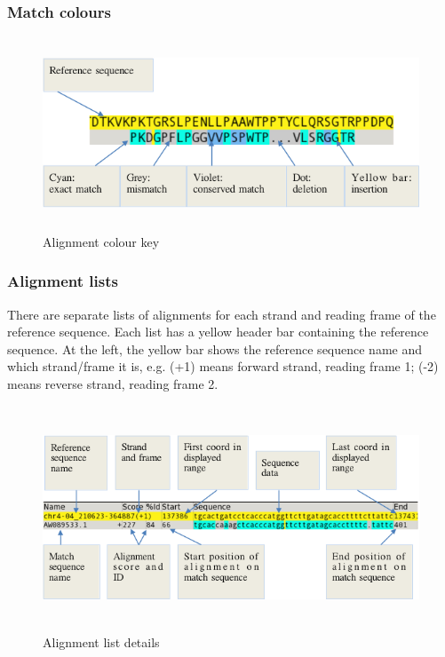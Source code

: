 \documentclass[letterpaper]{article}
\begin{document}
\bigskip

{\color[rgb]{0.30980393,0.5058824,0.7411765}\subsubsection[Match colours]{Match colours}}

\begin{figure}
\centering
\color[rgb]{0.30980393,0.5058824,0.7411765}
\includegraphics[width=14.353cm,height=5.74cm]{img_view_alignment_colour_key.png}
\caption{ Alignment colour key}
\end{figure}

{\color[rgb]{0.30980393,0.5058824,0.7411765}\subsubsection[Alignment lists]{Alignment lists}}
\hypertarget{RefHeading1701056909880}{}{
There are separate lists of alignments for each strand and reading frame
of the reference sequence. Each list has a yellow header bar
containing the reference sequence. At the left, the yellow bar shows
the reference sequence name and which strand/frame it is, e.g. (+1)
means forward strand, reading frame 1; (-2) means reverse strand,
reading frame 2.}

\begin{figure}
\centering
\color[rgb]{0.30980393,0.5058824,0.7411765}
\includegraphics[width=15.288cm,height=6.682cm]{img_view_alignment_details.png}
\caption{Alignment list details}
\end{figure}
\end{document}
